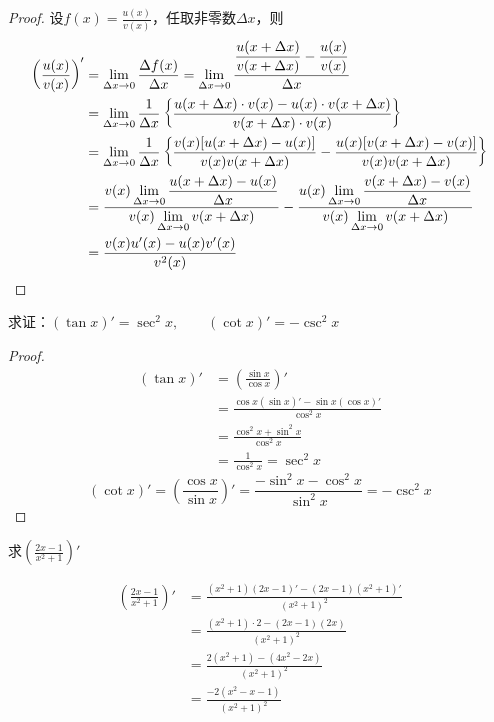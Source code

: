 \begin{proof}
    设$f(x)=\frac{u(x)}{v(x)}$，任取非零数$\Delta x$，则
\begin{align*}
    \left(\dfrac{u(x)}{v(x)}\right)'&=\lim_{\Delta x\to 0}\dfrac{\Delta f(x)}{\Delta x}=\lim_{\Delta x\to 0}\dfrac{\dfrac{u(x+\Delta x)}{v(x+\Delta x)}-\dfrac{u(x)}{v(x)}}{\Delta x}\\
    &=\lim_{\Delta x\to 0}\dfrac{1}{\Delta x}\left\{\dfrac{u(x+\Delta x)\cdot v(x)-u(x)\cdot v(x+\Delta x)}{v(x+\Delta x)\cdot v(x)}\right\}\\
    &=\lim_{\Delta x\to 0}\dfrac{1}{\Delta x}\left\{\dfrac{v(x)[u(x+\Delta x)-u(x)]}{v(x)v(x+\Delta x)}-\dfrac{u(x)[v(x+\Delta x)-v(x)]}{v(x)v(x+\Delta x)}\right\}\\
    &=\dfrac{v(x)\displaystyle\lim_{\Delta x\to 0}\dfrac{u(x+\Delta x)-u(x)}{\Delta x}}{v(x)\displaystyle\lim_{\Delta x\to 0}v(x+\Delta x)}-\dfrac{u(x)\displaystyle\lim_{\Delta x\to 0}\dfrac{v(x+\Delta x)-v(x)}{\Delta x}}{v(x)\displaystyle\lim_{\Delta x\to 0}v(x+\Delta x)}\\
    &=\dfrac{v(x) u'(x)-u(x) v'(x)}{v^2(x)}
\end{align*}
\end{proof}


\begin{example}
求证：$(\tan x)'=\sec^2 x,\qquad (\cot x)'=-\csc^2 x$
\end{example}

\begin{proof}    
\begin{align*}
    (\tan x)'&=\left(\frac{\sin x}{\cos x}\right)'\\
    &=\frac{\cos x(\sin x)'-\sin x(\cos x)'}{\cos^2 x}\\
    &=\frac{\cos^2 x+\sin^2 x}{\cos^2x}\\
    &=\frac{1}{\cos^2 x}=\sec^2 x
\end{align*}
\[(\cot x)'=\left(\frac{\cos x}{\sin x}\right)'=\frac{-\sin^2 x-\cos^2 x}{\sin^2 x}=-\csc^2 x\]    
\end{proof}

\begin{example}
    求$\left(\frac{2x-1}{x^2+1}\right)'$
\end{example}

\begin{solution}
\begin{align*}
    \left(\frac{2x-1}{x^2+1}\right)'&=\frac{(x^2+1)(2x-1)'-(2x-1)(x^2+1)'}{(x^2+1)^2}\\
&=\frac{(x^2+1)\cdot 2-(2x-1)(2x)}{(x^2+1)^2}\\
&=\frac{2(x^2+1)-(4x^2-2x)}{(x^2+1)^2}\\
&=\frac{-2(x^2-x-1)}{(x^2+1)^2}
\end{align*}
\end{solution}


